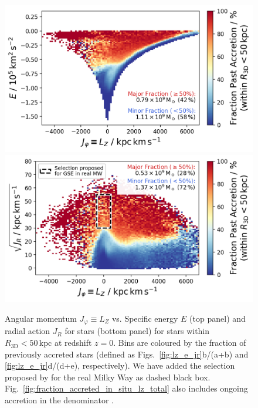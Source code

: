 \documentclass[fleqn,usenatbib]{mnras}
\begin{document}
\begin{figure}
    \centering
    \includegraphics[width=0.94\linewidth]{figures/fraction_accreted_in_situ_lz_e.png}
    \includegraphics[width=0.94\linewidth]{figures/fraction_accreted_in_situ_lz_jr.png}
    \caption{Angular momentum $J_\varphi \equiv L_Z$ vs. Specific energy $E$ (top panel) and radial action $J_R$ for stars (bottom panel) for stars within $R_\mathrm{3D} < 50\,\mathrm{kpc}$ at redshift $z=0$. Bins are coloured by the fraction of previously accreted stars (defined as Figs.~\ref{fig:lz_e_jr}b/(a+b) and \ref{fig:lz_e_jr}d/(d+e), respectively). We have added the selection proposed by \citet{Feuillet2020} for the real Milky Way as dashed black box. Fig.~\ref{fig:fraction_accreted_in_situ_lz_total} also includes ongoing accretion in the denominator \href{https://github.com/svenbuder/gse_nihaouhd/tree/main/figures}{\faGithub}.}
    \label{fig:fraction_accreted_in_situ_lz}
\end{figure}
\end{document}
